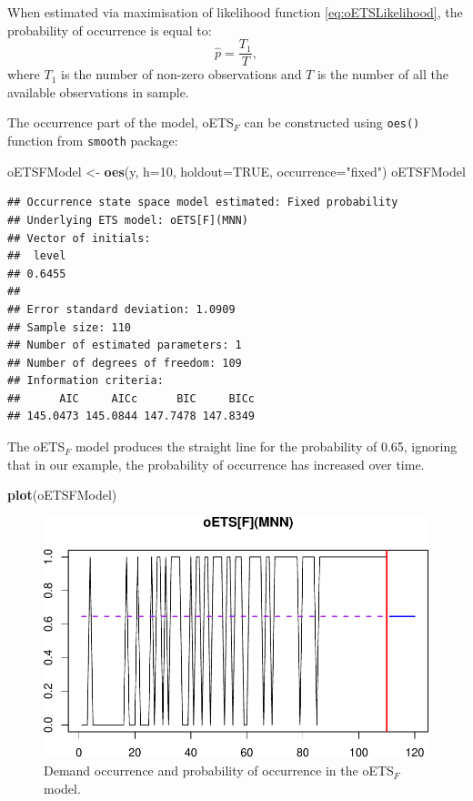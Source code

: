 \documentclass[]{book}
\newenvironment{Shaded}{\begin{snugshade}}{\end{snugshade}}
\newcommand{\DataTypeTok}[1]{\textcolor[rgb]{0.13,0.29,0.53}{#1}}
\newcommand{\DecValTok}[1]{\textcolor[rgb]{0.00,0.00,0.81}{#1}}
\newcommand{\KeywordTok}[1]{\textcolor[rgb]{0.13,0.29,0.53}{\textbf{#1}}}
\newcommand{\NormalTok}[1]{#1}
\newcommand{\OtherTok}[1]{\textcolor[rgb]{0.56,0.35,0.01}{#1}}
\newcommand{\StringTok}[1]{\textcolor[rgb]{0.31,0.60,0.02}{#1}}
\theoremstyle{definition}
\theoremstyle{definition}
\theoremstyle{definition}
\theoremstyle{definition}
\theoremstyle{remark}
\begin{document}
When estimated via maximisation of likelihood function \eqref{eq:oETSLikelihood}, the probability of occurrence is equal to:
\begin{equation}
\hat{p} = \frac{T_1}{T},
\label{eq:oETSFixedProbabilityMLE}
\end{equation}
where \(T_1\) is the number of non-zero observations and \(T\) is the number of all the available observations in sample.

The occurrence part of the model, oETS\(_F\) can be constructed using \texttt{oes()} function from \texttt{smooth} package:

\begin{Shaded}
\begin{Highlighting}[]
\NormalTok{oETSFModel <-}\StringTok{ }\KeywordTok{oes}\NormalTok{(y, }\DataTypeTok{h=}\DecValTok{10}\NormalTok{, }\DataTypeTok{holdout=}\OtherTok{TRUE}\NormalTok{,}
                  \DataTypeTok{occurrence=}\StringTok{"fixed"}\NormalTok{)}
\NormalTok{oETSFModel}
\end{Highlighting}
\end{Shaded}

\begin{verbatim}
## Occurrence state space model estimated: Fixed probability
## Underlying ETS model: oETS[F](MNN)
## Vector of initials:
##  level 
## 0.6455 
## 
## Error standard deviation: 1.0909
## Sample size: 110
## Number of estimated parameters: 1
## Number of degrees of freedom: 109
## Information criteria: 
##      AIC     AICc      BIC     BICc 
## 145.0473 145.0844 147.7478 147.8349
\end{verbatim}

The oETS\(_F\) model produces the straight line for the probability of 0.65, ignoring that in our example, the probability of occurrence has increased over time.

\begin{Shaded}
\begin{Highlighting}[]
\KeywordTok{plot}\NormalTok{(oETSFModel)}
\end{Highlighting}
\end{Shaded}

\begin{figure}
\centering
\includegraphics{Svetunkov--2022----ADAM_files/figure-latex/oETSFModel-1.pdf}
\caption{\label{fig:oETSFModel}Demand occurrence and probability of occurrence in the oETS\(_F\) model.}
\end{figure}
\end{document}
